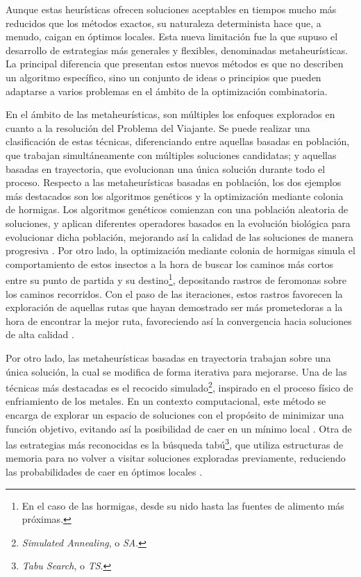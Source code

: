 Aunque estas heurísticas ofrecen soluciones aceptables en tiempos mucho más reducidos que los métodos exactos,
su naturaleza determinista hace que, a menudo, caigan en óptimos locales. Esta nueva limitación fue la que 
supuso el desarrollo de estrategias más generales y flexibles, denominadas metaheurísticas. La principal 
diferencia que presentan estos nuevos métodos es que no describen un algoritmo específico, sino un conjunto de
ideas o principios que pueden adaptarse a varios problemas en el ámbito de la optimización combinatoria.

En el ámbito de las metaheurísticas, son múltiples los enfoques explorados en cuanto a la resolución del Problema
del Viajante. Se puede realizar una clasificación de estas técnicas, diferenciando entre aquellas basadas en 
población, que trabajan simultáneamente con múltiples soluciones candidatas; y aquellas basadas en trayectoria, 
que evolucionan una única solución durante todo el proceso. Respecto a las metaheurísticas basadas en población, 
los dos ejemplos más destacados son los algoritmos genéticos y la optimización mediante colonia de hormigas. 
Los algoritmos genéticos comienzan con una población aleatoria de soluciones, y aplican diferentes operadores 
basados en la evolución biológica para evolucionar dicha población, mejorando así la calidad de las soluciones
de manera progresiva \cite{alhijawi2024}. Por otro lado, la optimización mediante colonia de hormigas simula el 
comportamiento de estos insectos a la hora de buscar los caminos más cortos entre su punto de partida y su 
destino\footnote{En el caso de las hormigas, desde su nido hasta las fuentes de alimento más próximas.}, depositando
rastros de feromonas sobre los caminos recorridos. Con el paso de las iteraciones, estos rastros favorecen la 
exploración de aquellas rutas que hayan demostrado ser más prometedoras a la hora de encontrar la mejor ruta, 
favoreciendo así la convergencia hacia soluciones de alta calidad \cite{dorigo2005}.

Por otro lado, las metaheurísticas basadas en trayectoria trabajan sobre una única solución, la cual se modifica
de forma iterativa para mejorarse. Una de las técnicas más destacadas es el recocido 
simulado\footnote{\textit{Simulated Annealing}, o \textit{SA}.}, inspirado en el proceso físico de 
enfriamiento de los metales. En un contexto computacional, este método se encarga de explorar un espacio de soluciones con el 
propósito de minimizar una función objetivo, evitando así la posibilidad de caer en un mínimo local \cite{gendreau2019}.
Otra de las estrategias más reconocidas es la búsqueda tabú\footnote{\textit{Tabu Search}, o \textit{TS}.}, que 
utiliza estructuras de memoria para no volver a visitar soluciones exploradas previamente, reduciendo las probabilidades
de caer en óptimos locales \cite{basu2012}.

